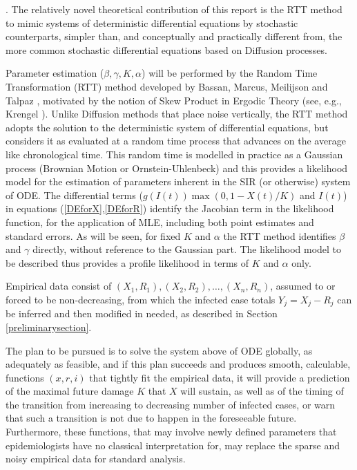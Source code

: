 \documentclass{article}
\begin{document}
\bigskip

. The relatively novel theoretical contribution of this report is the RTT method to mimic systems of deterministic differential equations by stochastic counterparts, simpler than, and conceptually and practically different from, the more common stochastic differential equations based on Diffusion processes.

Parameter estimation ($\beta, \gamma, K, \alpha$) will be performed by the Random Time Transformation (RTT) method developed by Bassan, Marcus, Meilijson and Talpaz \cite{Bassanetal}, motivated by the notion of Skew Product in Ergodic Theory (see, e.g., Krengel \cite{Krengel}). Unlike Diffusion methods that place noise vertically, the RTT method adopts the solution to the deterministic system of differential equations, but considers it as evaluated at a random time process that advances on the average like chronological time. This random time is modelled in practice as a Gaussian process (Brownian Motion or Ornstein-Uhlenbeck) and this provides a likelihood model for the estimation of parameters inherent in the SIR (or otherwise) system of ODE. The differential terms ($g(I(t)) \max(0,1 - X(t)/K)$ and $I(t)$) in equations (\ref{DEforX},\ref{DEforR}) identify the Jacobian term in the likelihood function, for the application of MLE, including both point estimates and standard errors. As will be seen, for fixed $K$ and $\alpha$ the RTT method identifies $\beta$ and $\gamma$ directly, without reference to the Gaussian part. The likelihood model to be described thus provides a profile likelihood in terms of $K$ and $\alpha$ only.

\bigskip

Empirical data consist of $(X_1,R_1), (X_2,R_2), \dots, (X_n, R_n)$, assumed to or forced to be non-decreasing,
from which the infected case totals $Y_j=X_j-R_j$ can be inferred and then modified in needed, as described in Section \ref{preliminarysection}.

The plan to be pursued is to solve the system above of ODE globally, as adequately as feasible, and if this plan succeeds and produces smooth, calculable, functions $(x,r,i)$ that tightly fit the empirical data, it will provide a prediction of the maximal future damage $K$ that $X$ will sustain, as well as of the timing of the transition from increasing to decreasing number of infected cases, or warn that such a transition is not due to happen in the foreseeable future. Furthermore, these functions, that may involve newly defined parameters that epidemiologists have no classical interpretation for, may replace the sparse and noisy empirical data for standard analysis.
\end{document}
